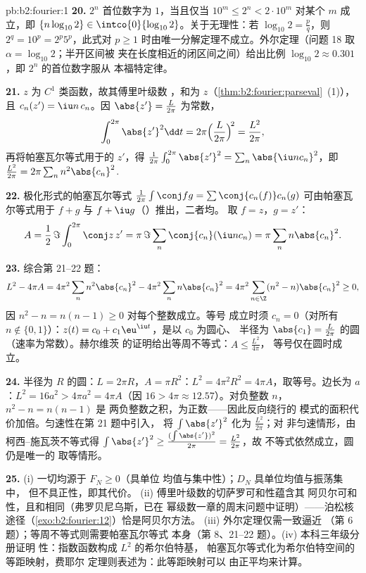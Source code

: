 \begin{solution}{pb:b2:fourier:1}
\textbf{20.} $2^n$ 首位数字为 $1$，当且仅当 $10^m \leq 2^n <
2\cdot10^m$ 对某个 $m$ 成立，即 $\{n\log_{10}2\} \in
\intco{0}{\log_{10}2}$。关于无理性：若 $\log_{10}2 =
\frac pq$，则 $2^q = 10^p = 2^p5^p$，此式对 $p
\geq 1$ 时由唯一分解定理不成立。外尔定理（问题 18
取 $\alpha = \log_{10}2$；半开区间被
夹在长度相近的闭区间之间）给出比例
$\log_{10}2 \approx 0.301$，即 $2^n$ 的首位数字服从
本福特定律。

\textbf{21.} $z$ 为 $C^1$ 类函数，故其傅里叶级数
，和为 $z$（\cref{thm:b2:fourier:parseval}~(1)），
且 $c_n(z') = \iu n\,c_n$。因 $\abs{z'} = \frac{L}{2\pi}$
为常数，
\[
\int_0^{2\pi}\abs{z'}^2\dd t
= 2\pi\Bigl(\frac{L}{2\pi}\Bigr)^{\!2}
= \frac{L^2}{2\pi} ,
\]
再将帕塞瓦尔等式用于的 $z'$，得
$\frac{1}{2\pi}\int_0^{2\pi}\abs{z'}^2 =
\sum_n\abs{\iu nc_n}^2$，即 $\frac{L^2}{2\pi} = 2\pi\sum_n
n^2\abs{c_n}^2$.

\textbf{22.} 极化形式的帕塞瓦尔等式 $\frac{1}{2\pi}\int\conj
fg = \sum\conj{c_n(f)}c_n(g)$ 可由帕塞瓦尔等式用于
$f + g$ 与 $f + \iu g$（）推出，二者均。
取 $f = z$，$g = z'$：
\[
A = \frac12\,\Im\int_0^{2\pi}\conj z\,z'
= \pi\,\Im\sum_n\conj{c_n}(\iu n c_n)
= \pi\sum_n n\abs{c_n}^2 .
\]

\textbf{23.} 综合第 21--22 题：
\[
L^2 - 4\pi A
= 4\pi^2\sum_n n^2\abs{c_n}^2 -
4\pi^2\sum_n n\abs{c_n}^2
= 4\pi^2\sum_{n\in\Z}(n^2 - n)\abs{c_n}^2 \geq 0 ,
\]
因 $n^2 - n = n(n-1) \geq 0$ 对每个整数成立。等号
成立时须 $c_n = 0$（对所有 $n \notin \{0, 1\}$）：$z(t) = c_0 +
c_1\eu^{\iu t}$，是以 $c_0$ 为圆心、
半径为 $\abs{c_1} = \frac{L}{2\pi}$ 的圆（速率为常数）。赫尔维茨
的证明给出等周不等式：$A \leq \frac{L^2}{4\pi}$，
等号仅在圆时成立。

\textbf{24.} 半径为 $R$ 的圆：$L = 2\pi R$，$A = \pi
R^2$：$L^2 = 4\pi^2R^2 = 4\pi A$，取等号。边长为
$a$：$L^2 = 16a^2 > 4\pi a^2 = 4\pi A$（因 $16 > 4\pi \approx
12.57$）。对负整数 $n$，$n^2 - n = n(n - 1)$ 是
两负整数之积，为正数——因此反向绕行的
模式的面积代价加倍。匀速性在第 21 题中引入，
将 $\int\abs{z'}^2$ 化为 $\frac{L^2}{2\pi}$；对
非匀速情形，由柯西–施瓦茨不等式得 $\int\abs{z'}^2 \geq
\frac{(\int\abs{z'})^2}{2\pi} = \frac{L^2}{2\pi}$，故
不等式依然成立，圆仍是唯一的
取等情形。

\textbf{25.} (i) 一切均源于 $F_N \geq 0$（具单位
均值与集中性）；$D_N$ 具单位均值与振荡集中，
但不具正性，即其代价。
(ii) 傅里叶级数的切萨罗可和性蕴含其
阿贝尔可和性，且和相同（弗罗贝尼乌斯，已在
幂级数一章的周末问题中证明）——泊松核
途径（\cref{exo:b2:fourier:12}）恰是阿贝尔方法。
(iii) 外尔定理仅需一致逼近
（第 6 题）；等周不等式则需要帕塞瓦尔等式
本身（第 8、21--22 题）。(iv) 本科三年级分册证明
性：指数函数构成 $L^2$ 的希尔伯特基，
帕塞瓦尔等式化为希尔伯特空间的等距映射，费耶尔
定理则表述为：此等距映射可以
由正平均来计算。
\end{solution}
